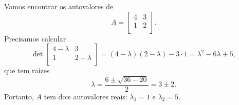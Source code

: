\begin{ex}\label{2x2}
	Vamos encontrar os autovalores de
	\begin{equation}
	A =
	\left[
	\begin{array}{cc}
	4 & 3 \\
	1 & 2 \\
	\end{array}
	\right].
	\end{equation} Precisamos calcular
	\begin{equation}
	\det\left[
	\begin{array}{cc}
	4-\lambda & 3 \\
	1 & 2-\lambda \\
	\end{array}
	\right] = (4-\lambda)(2-\lambda) - 3 \cdot 1 = \lambda^2 -6\lambda + 5,
	\end{equation} que tem raízes
	\begin{equation}
	\lambda = \frac{6 \pm \sqrt{36 - 20}}{2} = 3 \pm 2.
	\end{equation} Portanto, $A$ tem dois autovalores reais: $\lambda_1 = 1$ e $\lambda_2 = 5$.
\end{ex}


